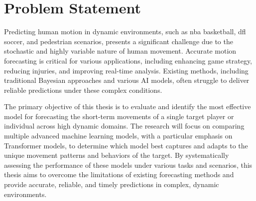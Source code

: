 \section{Problem Statement}

Predicting human motion in dynamic environments, such as \gls{nba} basketball, \gls{dfl} soccer, and pedestrian scenarios, presents a significant challenge due to the stochastic and highly variable nature of human movement. Accurate motion forecasting is critical for various applications, including enhancing game strategy, reducing injuries, and improving real-time analysis. Existing methods, including traditional Bayesian approaches and various AI models, often struggle to deliver reliable predictions under these complex conditions.

The primary objective of this thesis is to evaluate and identify the most effective model for forecasting the short-term movements of a single target player or individual across high dynamic domains. The research will focus on comparing multiple advanced machine learning models, with a particular emphasis on Transformer models, to determine which model best captures and adapts to the unique movement patterns and behaviors of the target. By systematically assessing the performance of these models under various tasks and scenarios, this thesis aims to overcome the limitations of existing forecasting methods and provide accurate, reliable, and timely predictions in complex, dynamic environments.